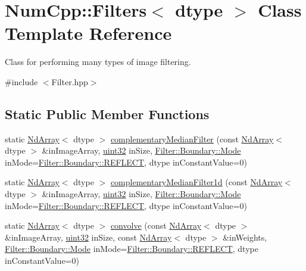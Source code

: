 \hypertarget{class_num_cpp_1_1_filters}{}\section{Num\+Cpp\+:\+:Filters$<$ dtype $>$ Class Template Reference}
\label{class_num_cpp_1_1_filters}


Class for performing many types of image filtering.  




{\ttfamily \#include $<$Filter.\+hpp$>$}

\subsection*{Static Public Member Functions}
\begin{DoxyCompactItemize}
\item 
static \mbox{\hyperlink{class_num_cpp_1_1_nd_array}{Nd\+Array}}$<$ dtype $>$ \mbox{\hyperlink{class_num_cpp_1_1_filters_aae121f772eb9a6f8eb1f13a15327ac22}{complementary\+Median\+Filter}} (const \mbox{\hyperlink{class_num_cpp_1_1_nd_array}{Nd\+Array}}$<$ dtype $>$ \&in\+Image\+Array, \mbox{\hyperlink{namespace_num_cpp_a36f388e948380413c63011cab9b7fbd5}{uint32}} in\+Size, \mbox{\hyperlink{struct_num_cpp_1_1_filter_1_1_boundary_a3fb520b67d524104db12ceef41adf081}{Filter\+::\+Boundary\+::\+Mode}} in\+Mode=\mbox{\hyperlink{struct_num_cpp_1_1_filter_1_1_boundary_a3fb520b67d524104db12ceef41adf081ad0d71a6dafb7ae1e96441e3f9f7aced8}{Filter\+::\+Boundary\+::\+R\+E\+F\+L\+E\+CT}}, dtype in\+Constant\+Value=0)
\item 
static \mbox{\hyperlink{class_num_cpp_1_1_nd_array}{Nd\+Array}}$<$ dtype $>$ \mbox{\hyperlink{class_num_cpp_1_1_filters_afa935d5bb626ddf3c8465c61f25e3a42}{complementary\+Median\+Filter1d}} (const \mbox{\hyperlink{class_num_cpp_1_1_nd_array}{Nd\+Array}}$<$ dtype $>$ \&in\+Image\+Array, \mbox{\hyperlink{namespace_num_cpp_a36f388e948380413c63011cab9b7fbd5}{uint32}} in\+Size, \mbox{\hyperlink{struct_num_cpp_1_1_filter_1_1_boundary_a3fb520b67d524104db12ceef41adf081}{Filter\+::\+Boundary\+::\+Mode}} in\+Mode=\mbox{\hyperlink{struct_num_cpp_1_1_filter_1_1_boundary_a3fb520b67d524104db12ceef41adf081ad0d71a6dafb7ae1e96441e3f9f7aced8}{Filter\+::\+Boundary\+::\+R\+E\+F\+L\+E\+CT}}, dtype in\+Constant\+Value=0)
\item 
static \mbox{\hyperlink{class_num_cpp_1_1_nd_array}{Nd\+Array}}$<$ dtype $>$ \mbox{\hyperlink{class_num_cpp_1_1_filters_acf5da263331a56f2d28778226bffff62}{convolve}} (const \mbox{\hyperlink{class_num_cpp_1_1_nd_array}{Nd\+Array}}$<$ dtype $>$ \&in\+Image\+Array, \mbox{\hyperlink{namespace_num_cpp_a36f388e948380413c63011cab9b7fbd5}{uint32}} in\+Size, const \mbox{\hyperlink{class_num_cpp_1_1_nd_array}{Nd\+Array}}$<$ dtype $>$ \&in\+Weights, \mbox{\hyperlink{struct_num_cpp_1_1_filter_1_1_boundary_a3fb520b67d524104db12ceef41adf081}{Filter\+::\+Boundary\+::\+Mode}} in\+Mode=\mbox{\hyperlink{struct_num_cpp_1_1_filter_1_1_boundary_a3fb520b67d524104db12ceef41adf081ad0d71a6dafb7ae1e96441e3f9f7aced8}{Filter\+::\+Boundary\+::\+R\+E\+F\+L\+E\+CT}}, dtype in\+Constant\+Value=0)

\end{DoxyCompactItemize}
